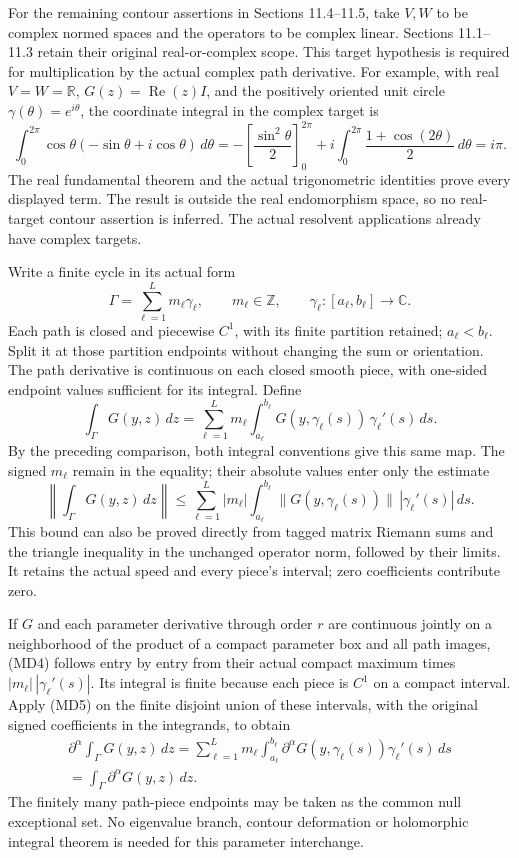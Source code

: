 \documentclass[
  11pt,
]{article}
\begin{document}
For the remaining contour assertions in Sections 11.4--11.5, take
\(V,W\) to be complex normed spaces and the operators to be complex
linear. Sections 11.1--11.3 retain their original real-or-complex scope.
This target hypothesis is required for multiplication by the actual
complex path derivative. For example, with real \(V=W=\mathbb R\),
\(G(z)=\operatorname{Re}(z)I\), and the positively oriented unit circle
\(\gamma(\theta)=e^{i\theta}\), the coordinate integral in the complex
target is \[
 \int_0^{2\pi}\cos\theta(-\sin\theta+i\cos\theta)\,d\theta
 =-\left[\frac{\sin^2\theta}{2}\right]_0^{2\pi}
  +i\int_0^{2\pi}\frac{1+\cos(2\theta)}2\,d\theta
 =i\pi.
 \tag{MD11a}
\] The real fundamental theorem and the actual trigonometric identities
prove every displayed term. The result is outside the real endomorphism
space, so no real-target contour assertion is inferred. The actual
resolvent applications already have complex targets.

Write a finite cycle in its actual form \[
 \Gamma=\sum_{\ell=1}^L m_\ell\gamma_\ell,\qquad
 m_\ell\in\mathbb Z,\qquad
 \gamma_\ell:[a_\ell,b_\ell]\to\mathbb C .
\tag{MD11}
\] Each path is closed and piecewise \(C^1\), with its finite partition
retained; \(a_\ell<b_\ell\). Split it at those partition endpoints
without changing the sum or orientation. The path derivative is
continuous on each closed smooth piece, with one-sided endpoint values
sufficient for its integral. Define \[
 \int_\Gamma G(y,z)\,dz
       =\sum_{\ell=1}^L m_\ell
          \int_{a_\ell}^{b_\ell}
             G(y,\gamma_\ell(s))\,\gamma_\ell'(s)\,ds .
\tag{MD12}
\] By the preceding comparison, both integral conventions give this same
map. The signed \(m_\ell\) remain in the equality; their absolute values
enter only the estimate \[
 \left\|\int_\Gamma G(y,z)\,dz\right\|
       \leq\sum_{\ell=1}^L |m_\ell|
          \int_{a_\ell}^{b_\ell}
             \|G(y,\gamma_\ell(s))\|\,|\gamma_\ell'(s)|\,ds .
\tag{MD13}
\] This bound can also be proved directly from tagged matrix Riemann
sums and the triangle inequality in the unchanged operator norm,
followed by their limits. It retains the actual speed and every piece's
interval; zero coefficients contribute zero.

If \(G\) and each parameter derivative through order \(r\) are
continuous jointly on a neighborhood of the product of a compact
parameter box and all path images, (MD4) follows entry by entry from
their actual compact maximum times \(|m_\ell|\,|\gamma_\ell'(s)|\). Its
integral is finite because each piece is \(C^1\) on a compact interval.
Apply (MD5) on the finite disjoint union of these intervals, with the
original signed coefficients in the integrands, to obtain \[
\begin{gathered}
\partial^\alpha\int_\Gamma G(y,z)\,dz
=\sum_{\ell=1}^L m_\ell\int_{a_\ell}^{b_\ell}
\partial^\alpha G(y,\gamma_\ell(s))\gamma_\ell'(s)\,ds\\
=\int_\Gamma\partial^\alpha G(y,z)\,dz .
\end{gathered}
\tag{MD14}
\] The finitely many path-piece endpoints may be taken as the common
null exceptional set. No eigenvalue branch, contour deformation or
holomorphic integral theorem is needed for this parameter interchange.
\end{document}
